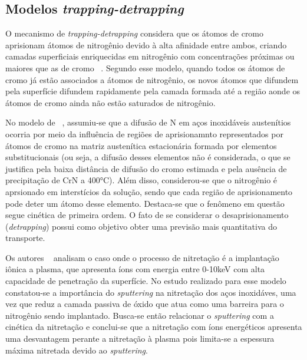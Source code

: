 \documentclass[]{politex}
\begin{document}
\subsection{Modelos \textit{trapping-detrapping}}
\label{sec:trap-detrap}
	O mecanismo de \textit{trapping-detrapping} considera que os átomos de cromo aprisionam átomos de nitrogênio devido à alta afinidade entre ambos, criando camadas superficiais enriquecidas em nitrogênio com concentrações próximas ou maiores que as de cromo ~\cite{parascandola2000nitrogen}. Segundo esse modelo, quando todos os átomos de cromo já estão associados a átomos de nitrogênio, os novos átomos que difundem pela superfície difundem rapidamente pela camada formada até a região aonde os átomos de cromo ainda não estão saturados de nitrogênio.  \par
	No modelo de ~\cite{parascandola2000nitrogen}, assumiu-se que a difusão de N em aços inoxidáveis austenítios ocorria por meio da influência de regiões de aprisionamnto representados por átomos de cromo na matriz austenítica estacionária formada por elementos substitucionais (ou seja, a difusão desses elementos não é considerada, o que se justifica pela baixa distância de difusão do cromo estimada e pela ausência de precipitação de CrN a 400°C). Além disso, considerou-se que o nitrogênio é aprsionado em interstícios da solução, sendo que cada região de aprisionamento pode deter um átomo desse elemento. Destaca-se que o fenômeno em questão segue cinética de primeira ordem. O fato de se considerar o desaprisionamento (\textit{detrapping}) possui como objetivo obter uma previsão mais quantitativa do transporte. \par
	Os autores ~\cite{moller2001surface} analisam o caso onde o processo de nitretação é a implantação iônica a plasma, que apresenta íons com energia entre 0-10keV com alta capacidade de penetração da superfície. No estudo realizado para esse modelo constatou-se a importância do \textit{sputtering} na nitretação dos aços inoxidáves, uma vez que reduz a camada passiva de óxido que atua como uma barreira para o nitrogênio sendo implantado. Busca-se então relacionar o \textit{sputtering} com a cinética da nitretação e conclui-se que a nitretação com íons energéticos apresenta uma desvantagem perante a nitretação à plasma pois limita-se a espessura máxima nitretada devido ao \textit{sputtering}. \par
\end{document}
